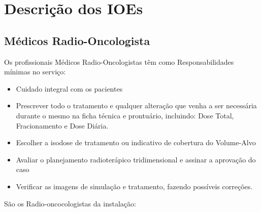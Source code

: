 \chapter{Descrição dos IOEs}
\label{ch:descricao_ioe}

\section{Médicos Radio-Oncologista}
Os profissionais Médicos Radio-Oncologistas têm como Responsabilidades mínimas no serviço:

\begin{itemize}
    \item Cuidado integral com os pacientes
    \item Prescrever todo o tratamento e qualquer alteração que venha a ser necessária durante o mesmo na ficha técnica e prontuário, incluindo: Dose Total, Fracionamento e Dose Diária.
    \item Escolher a isodose de tratamento ou indicativo de cobertura do Volume-Alvo
    \item Avaliar o planejamento radioterápico tridimensional e assinar a aprovação do caso
    \item Verificar as imagens de simulação e tratamento, fazendo possíveis correções.
\end{itemize}

São os Radio-oncocologistas da instalação:

\begin{table}[!ht]
    \centering
    \caption{Equipe de Radio-Oncologistas.}
    \label{tab:radiooncologistas}
\end{table}

